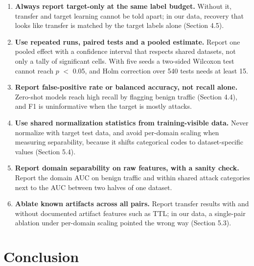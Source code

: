 \documentclass[11pt]{article}
\begin{document}
\begin{enumerate}
\item \textbf{Always report target-only at the same label budget.} Without it, transfer and target learning cannot be told apart; in our data, recovery that looks like transfer is matched by the target labels alone (Section 4.5).
\item \textbf{Use repeated runs, paired tests and a pooled estimate.} Report one pooled effect with a confidence interval that respects shared datasets, not only a tally of significant cells. With five seeds a two-sided Wilcoxon test cannot reach $p$ $<$ 0.05, and Holm correction over 540 tests needs at least 15.
\item \textbf{Report false-positive rate or balanced accuracy, not recall alone.} Zero-shot models reach high recall by flagging benign traffic (Section 4.4), and F1 is uninformative when the target is mostly attacks.
\item \textbf{Use shared normalization statistics from training-visible data.} Never normalize with target test data, and avoid per-domain scaling when measuring separability, because it shifts categorical codes to dataset-specific values (Section 5.4).
\item \textbf{Report domain separability on raw features, with a sanity check.} Report the domain AUC on benign traffic and within shared attack categories next to the AUC between two halves of one dataset.
\item \textbf{Ablate known artifacts across all pairs.} Report transfer results with and without documented artifact features such as TTL; in our data, a single-pair ablation under per-domain scaling pointed the wrong way (Section 5.3).
\end{enumerate}

\section{Conclusion}
\end{document}
